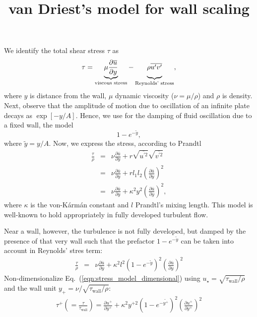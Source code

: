 \documentclass[a4paper,12pt]{article}
\title{van Driest's model for wall scaling}
\newcommand{\p}{\partial}
\begin{document}
We identify the total shear stress $\tau$ as
\begin{equation}
  \tau = \underbrace{\mu \frac{\p \overline{u}}{\p y}}_\text{viscous stress} - \underbrace{\rho \overline{u^\prime v^\prime}\vphantom{\frac{\p \overline{u}}{\p y}}}_\text{Reynolds' stress}, 
\end{equation}
where $y$ is distance from the wall, $\mu$ dynamic viscosity ($\nu=\mu/\rho$) and $\rho$ is density. 
Next, observe that the amplitude of motion due to oscillation of an infinite plate decays as $\exp\left[-y/A\right]$. Hence, we use for the damping of fluid oscillation due to a fixed wall, the model
\begin{equation}
  1- e^{-\tilde{y}},
\end{equation}
where $\tilde{y}=y/A$. Now, we express the stress, according to Prandtl
\begin{subequations} 
\begin{eqnarray}
  \frac{\tau}{\rho} &=& \nu \frac{\p \overline{u}}{\p y} +  r \sqrt{\overline{u^{\prime2}}} \sqrt{\overline{v^{\prime2}}}  \\
       &=& \nu \frac{\p \overline{u}}{\p y} + r l_1 l_2 \left(\frac{\p \overline{u}}{\p y} \right)^2 \\
       &=& \nu \frac{\p \overline{u}}{\p y} + \kappa^2 y^2 \left(\frac{\p \overline{u}}{\p y} \right)^2, 
\end{eqnarray}
\end{subequations}
where $\kappa$ is the von-K\'arm\'an constant and $l$ Prandtl's mixing length. This model is well-known to hold appropriately in fully developed turbulent flow.

\par

Near a wall, however, the turbulence is not fully developed, but damped by the presence of that very wall such that the prefactor $1-e^{-\tilde{y}}$ can be taken into account in Reynolds' stres term:
\begin{eqnarray}
  \label{eqn:stress_model_dimensional}
  \frac{\tau}{\rho} &=& \nu \frac{\p \overline{u}}{\p y} + \kappa^2 l^2 \left(1- e^{-\tilde{y}}\right)^2\left(\frac{\p \overline{u}}{\p y}\right)^2
\end{eqnarray} 
Non-dimensionalize Eq.~(\ref{eqn:stress_model_dimensional}) using $u_\star=\sqrt{\tau_\text{wall}/{\rho}}$ and the wall unit $y_+=\nu/\sqrt{\tau_\text{wall}/\rho}$:
\begin{eqnarray}
  \tau^+ \left( = \frac{\tau}{\tau_\text{wall}} \right) = \frac{\p u^+}{\p y^+} + \kappa^2 y^{+2} \left(1- e^{-\widetilde{y^+}}\right)^2 \left(\frac{\p u^+}{\p y^+} \right)^2
\end{eqnarray}
\end{document}
